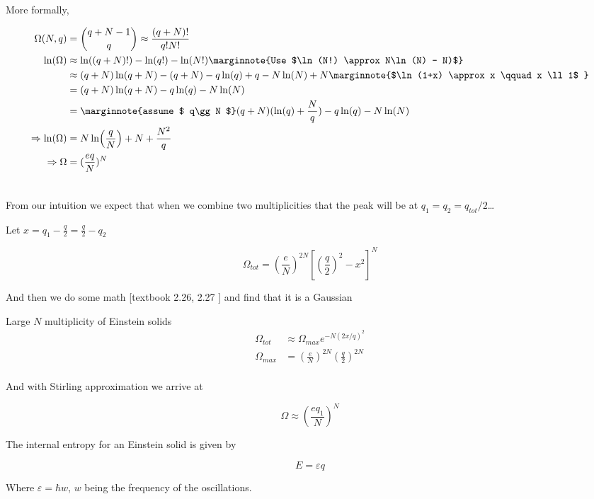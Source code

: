 \documentclass[10pt]{article}
\begin{document}
More formally,


\begin{equation}
	\begin{split}
		\Omega(N, q)  &=  \binom{q+N-1}{q} \approx \frac{(q+N)!}{q!N!} \\
		\ln(\Omega)&\approx \ln((q+N)!) -\ln(q!) - \ln(N!) \marginnote{Use $\ln(N!) \approx N\ln(N) - N)$} \\
							&\approx (q+N)\ln(q+N)  - (q+N) - q\ln(q) + q - N\ln(N) + N \marginnote{$\ln(1+x) \approx x \qquad x \ll 1$ }\\
&= (q+N)\ln(q+N) - q\ln(q) - N\ln(N) \\
&= \marginnote{assume $ q\gg N $} (q+N)(\ln(q) + \frac{N}{q}) - q\ln(q) - N \ln(N)\\
\Rightarrow\ln(\Omega) &= N \ln(\frac{q}{N}) + N + \frac{N^2}{q} \\
\Rightarrow \Omega &= (\frac{eq}{N})^N  \\  \\
	\end{split}
	\label{eq:294:large_n_deriv}
\end{equation}

From our intuition we expect that when we combine two multiplicities that the peak will be at $ q_1 = q_2 = q_{tot}/2 $\ldots


Let $ x = q_1 - \frac{q}{2} = \frac{q}{2} - q_2 $

\begin{equation}
	\Omega_{tot} = (\frac{e}{N})^{2N} [(\frac{q}{2})^2 - x^2]^N
\end{equation}

And then we do some math [textbook 2.26, 2.27 ] and find that it is a Gaussian


\begin{definition}
	Large $ N $ multiplicity of Einstein solids
	\begin{equation}
		\begin{split}
			\Omega_{tot}&\approx \Omega_{max} e^{-N(2x/q)^2} \\
			\Omega_{max}&= (\frac{e}{N})^{2N} (\frac{q}{2})^{2N}  \\
		\end{split}
	\end{equation}

	And with Stirling approximation we arrive at

	\begin{equation}
		\Omega \approx \left( \frac{eq_1}{N} \right)^N
		\label{eq:294:omega_stirling}
	\end{equation}

	The internal entropy for an Einstein solid is given by

	\begin{equation}
		E = \varepsilon q
	\end{equation}

	Where $ \varepsilon = \hbar w $, $ w $ being the frequency of the oscillations.
	
	

\end{definition}
\end{document}
